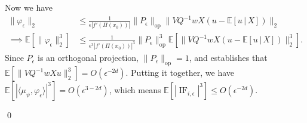 \documentclass[11pt]{article}
\begin{document}
Now we have
\begin{align*}
    \|\varphi_{\epsilon}\|_2 &\leq \frac{1}{\epsilon|f'(\Pi(x_0))|}\|P_{\epsilon}\|_{\text{op}} \|VQ^{-1}wX(u - \mathbb{E}[u \,|\, X])\|_2  \\
    \implies \mathbb{E}[\|\varphi_{\epsilon}\|_2^3] &\leq \frac{1}{\epsilon^3|f'(\Pi(x_0))|^3}\|P_{\epsilon}\|_{\text{op}}^3 \mathbb{E}[\|VQ^{-1}wX(u - \mathbb{E}[u \,|\, X])\|_2^3].
\end{align*}
Since $P_{\epsilon}$ is an orthogonal projection, $\|P_{\epsilon}\|_{\text{op}} = 1$, and  establishes that $\mathbb{E}[\|VQ^{-1}wXu\|_2^3] = O(\epsilon^{-2d})$.  Putting it together, we have $\mathbb{E}\left[|\langle \mu_{\psi}, \varphi_{\epsilon}\rangle|^3 \right] = O(\epsilon^{3-2d})$, which means $\mathbb{E}[|\operatorname{IF}_{i, \epsilon}|^3] \leq O(\epsilon^{-2d})$. 

\qed{}
\end{document}
